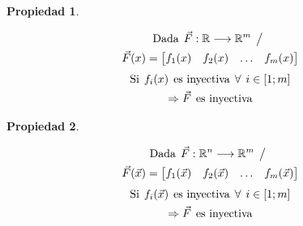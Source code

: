 \documentclass[a5paper,12pt,twoside]{book}
\newtheorem{prop}{{Propiedad}}[chapter]
\begin{document}
\begin{mdframed}[style=PropertyFrame]
    \begin{prop}
    \end{prop}
    \begin{multline*}
        \textrm{Dada} \hspace{1ex} \Vec{F}: \mathbb{R} \longrightarrow \mathbb{R}^m \hspace{1ex} \big/ \hspace{1ex}
        \\
        \Vec{F}(x) = \begin{bmatrix} f_1(x) & f_2(x) & \ldots & f_m(x) \end{bmatrix}
    \end{multline*}
    \begin{gather*}
        \textrm{Si} \hspace{1ex} f_i(x) \hspace{1ex} \textrm{es inyectiva} \hspace{1ex} \forall \hspace{1ex} i \in [1;m]
        \\
        \Rightarrow \Vec{F} \hspace{1ex} \textrm{es inyectiva}
    \end{gather*}
\end{mdframed}

\begin{mdframed}[style=PropertyFrame]
    \begin{prop}
    \end{prop}
    \begin{multline*}
        \textrm{Dada} \hspace{1ex} \Vec{F}: \mathbb{R}^n \longrightarrow \mathbb{R}^m \hspace{1ex} \big/ \hspace{1ex}
        \\
        \Vec{F}(\Vec{x}) = \begin{bmatrix} f_1(\Vec{x}) & f_2(\Vec{x}) & \ldots & f_m(\Vec{x}) \end{bmatrix}
    \end{multline*}
    \begin{gather*}
        \textrm{Si} \hspace{1ex} f_i(\Vec{x}) \hspace{1ex} \textrm{es inyectiva} \hspace{1ex} \forall \hspace{1ex} i \in [1;m]
        \\
        \Rightarrow \Vec{F} \hspace{1ex} \textrm{es inyectiva}
    \end{gather*}
\end{mdframed}
\end{document}
